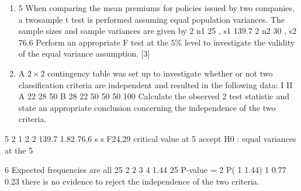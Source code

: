 \documentclass[a4paper,12pt]{article}
\begin{document}
\begin{enumerate}
\item

5 When comparing the mean premiums for policies issued by two companies, a twosample
t test is performed assuming equal population variances. The sample sizes and
sample variances are given by
2
n1 25 , s1 139.7
2
n2 30 , s2 76.6
Perform an appropriate F test at the 5\% level to investigate the validity of the equal
variance assumption. [3]
\item A $2 \times 2$ contingency table was set up to investigate whether or not two classification
criteria are independent and resulted in the following data:
I II
A 22 28 50
B 28 22 50
50 50 100
Calculate the observed 2 test statistic and state an appropriate conclusion concerning
the independence of the two criteria. 

\end{enumerate}
5
2
1
2
2
139.7
1.82
76.6
s
s
F24,29 critical value at 5%
accept H0 : equal variances at the 5%

\newpage 
6 Expected frequencies are all 25
2
2 3
4 1.44
25
P-value = 2
P( 1 1.44) 1 0.77 0.23
there is no evidence to reject the independence of the two criteria.

\end{document}
